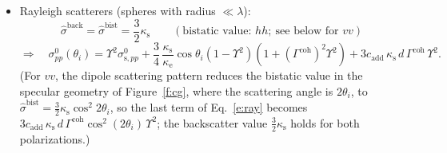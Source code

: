 \documentclass[11pt, oneside]{article}
\newcommand{\Gc}[1]{\Gamma_{#1}^\mathrm{coh}}
\begin{document}
\begin{itemize}
\begin{equation}
	\end{equation}
	where $\Upsilon \equiv \Upsilon_p$ and $\Gamma^\mathrm{coh} \equiv \Gc{p}$.
	\item Rayleigh scatterers (spheres with radius $\ll\lambda$):
	\begin{equation}
		\label{e:ray_s}
		\hat{\sigma}^\mathrm{back} = \hat{\sigma}^\mathrm{bist} = \frac{3}{2}\kappa_\mathrm{s}
		\qquad (\text{bistatic value: } hh;\ \text{see below for } vv)
	\end{equation}
	\begin{equation}
		\label{e:ray}
		\Rightarrow\quad \sigma^0_{pp}(\theta_i) = \Upsilon^2\sigma^0_{\mathrm{s},pp} + \frac{3}{4}\,\frac{\kappa_\mathrm{s}}{\kappa_\mathrm{e}}\cos\theta_i\left(1 - \Upsilon^2\right)\left(1 + (\Gamma^\mathrm{coh})^2\Upsilon^2\right) + 3c_\mathrm{add}\,\kappa_\mathrm{s}\,d\,\Gamma^\mathrm{coh}\,\Upsilon^2.
	\end{equation}
	(For $vv$, the dipole scattering pattern reduces the bistatic value in the specular geometry of Figure~\ref{f:cg}, where the scattering angle is $2\theta_i$, to $\hat{\sigma}^\mathrm{bist} = \frac{3}{2}\kappa_\mathrm{s}\cos^2 2\theta_i$, so the last term of Eq.~\eqref{e:ray} becomes $3c_\mathrm{add}\,\kappa_\mathrm{s}\,d\,\Gamma^\mathrm{coh}\cos^2(2\theta_i)\,\Upsilon^2$; the backscatter value $\frac{3}{2}\kappa_\mathrm{s}$ holds for both polarizations.)

\end{itemize}
\end{document}
